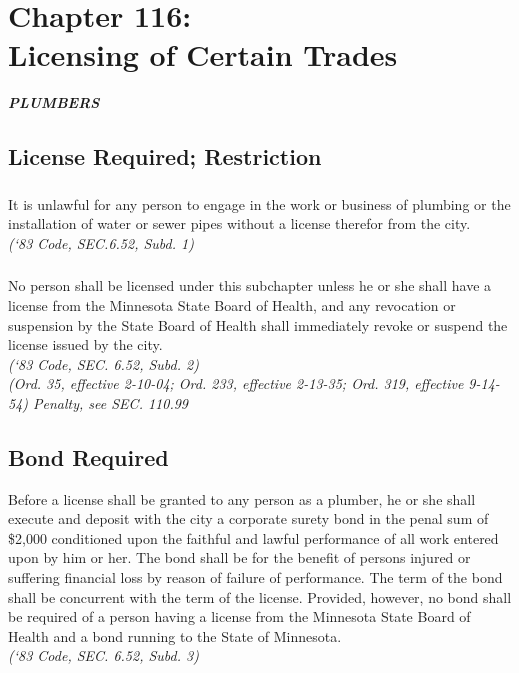 \chapter*{Chapter 116: \\
	Licensing of Certain Trades}
    \minitoc
    \pagebreak

\begin{center}
    \emph{\textbf{\LARGE{PLUMBERS}}}
\end{center}

\section{License Required; Restriction}
\subsection{}
It is unlawful for any person to engage in the work or business of plumbing or the installation of water or sewer pipes without a license therefor from the city.\\
\emph{(‘83 Code, SEC.6.52, Subd. 1)}
\subsection{}
No person shall be licensed under this subchapter unless he or she shall have a license from the Minnesota State Board of Health, and any revocation or suspension by the State Board of Health shall immediately revoke or suspend the license issued by the city.\\
\emph{(‘83 Code, SEC. 6.52, Subd. 2)}\\
\emph{(Ord. 35, effective 2-10-04; Ord. 233, effective 2-13-35; Ord. 319, effective 9-14-54)  Penalty, see SEC. 110.99}
\section{Bond Required}
Before a license shall be granted to any person as a plumber, he or she shall execute and deposit with the city a corporate surety bond in the penal sum of \$2,000 conditioned upon the faithful and lawful performance of all work entered upon by him or her. The bond shall be for the benefit of persons injured or suffering financial loss by reason of failure of performance. The term of the bond shall be concurrent with the term of the license. Provided, however, no bond shall be required of a person having a license from the Minnesota State Board of Health and a bond running to the State of Minnesota.\\
\emph{(‘83 Code, SEC. 6.52, Subd. 3)}
